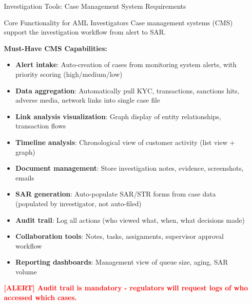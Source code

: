 \documentclass[11pt,a4paper]{beamer}
\newcommand{\redflag}[1]{\textcolor{red}{\textbf{[ALERT] #1}}}
\begin{document}
\begin{frame}{Investigation Tools: Case Management System Requirements}
	\begin{block}{Core Functionality for AML Investigators}
		Case management systems (CMS) support the investigation workflow from alert to SAR.
	\end{block}
	\textbf{Must-Have CMS Capabilities:}
	\begin{itemize}
		\item \textbf{Alert intake}: Auto-creation of cases from monitoring system alerts, with priority scoring (high/medium/low)
		\item \textbf{Data aggregation}: Automatically pull KYC, transactions, sanctions hits, adverse media, network links into single case file
		\item \textbf{Link analysis visualization}: Graph display of entity relationships, transaction flows
		\item \textbf{Timeline analysis}: Chronological view of customer activity (list view + graph)
		\item \textbf{Document management}: Store investigation notes, evidence, screenshots, emails
		\item \textbf{SAR generation}: Auto-populate SAR/STR forms from case data (populated by investigator, not auto-filed)
		\item \textbf{Audit trail}: Log all actions (who viewed what, when, what decisions made)
		\item \textbf{Collaboration tools}: Notes, tasks, assignments, supervisor approval workflow
		\item \textbf{Reporting dashboards}: Management view of queue size, aging, SAR volume
	\end{itemize}
	\redflag{Audit trail is mandatory - regulators will request logs of who accessed which cases.}
\end{frame}
\end{document}
